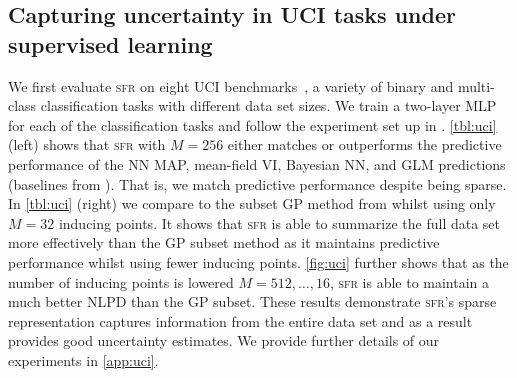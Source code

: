 \documentclass{article} %
\newcommand{\our}{\textsc{sfr}\xspace}
\begin{document}
\subsection{Capturing uncertainty in UCI tasks under supervised learning}
\label{sec:uci}
%
We first evaluate \our on eight UCI benchmarks~\cite{UCI}, a variety of binary and multi-class classification tasks with different data set sizes.
We train a two-layer MLP for each of the classification tasks and follow the experiment set up in \cite{immer2021improving}.
\cref{tbl:uci} (left) shows that \our with $M=256$ either matches or outperforms the predictive performance of the NN MAP, mean-field VI, Bayesian NN, and GLM
predictions %
(baselines from \cite{immer2021improving}).
That is, we match predictive performance despite being sparse.
%
In \cref{tbl:uci} (right) we compare to the subset GP method from \cite{immer2021improving} whilst using only $M=32$ inducing points.
It shows that \our is able to summarize the full data set more effectively than the GP subset method as it maintains predictive performance
whilst using fewer inducing points.
\cref{fig:uci} further shows that as the number of inducing points is lowered $M=512,\ldots, 16$, \our is able to maintain a much better NLPD than the GP subset.
These results demonstrate \our's sparse representation captures information from the entire data set and as a result provides good uncertainty estimates.
We provide further details of our experiments in \cref{app:uci}.



\end{document}
